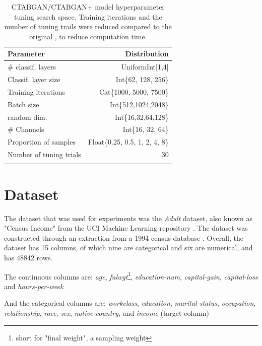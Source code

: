 \begin{table}[h]
	\centering
	\begin{tabular}{lr}
		\toprule
		Parameter               & Distribution                   \\
		\midrule
		\# classif. layers      & UniformInt[1,4]                \\
		Classif. layer size     & Int\{62, 128, 256\}            \\
		Training iterations    & Cat\{1000, 5000, 7500\}        \\
		Batch size              & Int\{512,1024,2048\}           \\
		random dim.             & Int\{16,32,64,128\}            \\
		\# Channels             & Int\{16, 32, 64\}              \\
		Proportion of samples   & Float\{0.25, 0.5, 1, 2, 4, 8\} \\
		\midrule
		Number of tuning trials & 30                             \\
		\bottomrule
		\multicolumn{2}{c}{}\\[-0.2em] %
	\end{tabular}
	\caption[CTABGAN(+) Hyperparameter Search Space]{CTABGAN/CTABGAN+ model hyperparameter tuning search space. Training iterations and the number of tuning trails were reduced compared to the original \cite{kotelnikov2022TabDDPMModellingTabular}, to reduce computation time.}
	\label{tab:ctabgan_tune}
\end{table}

\section{Dataset}
\label{ch:methods-datasets}

The dataset that was used for experiments was the \textit{Adult} dataset, also known as "Census Income" from the UCI Machine Learning repository \cite{Dua:2019}.
The dataset was constructed through an extraction from a 1994 census database \cite{kohavi1996ScalingAccuracyNaiveBayes}.
Overall, the dataset has 15 columns, of which nine are categorical and six are numerical, and has 48842 rows.

The continuous columns are: \textit{age}, \textit{fnlwgt}\footnote{short for "final weight", a sampling weight}, \textit{education-num}, \textit{capital-gain}, \textit{capital-loss} and \textit{hours-per-week}


And the categorical columns are: \textit{workclass}, \textit{education}, \textit{marital-status}, \textit{occupation}, \textit{relationship}, \textit{race}, \textit{sex}, \textit{native-country}, and \textit{income} (target column)



